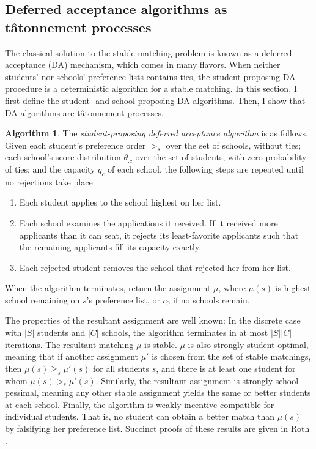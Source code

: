 \documentclass[12pt]{article}
\theoremstyle{definition}
\newtheorem{algorithm}{Algorithm}
\begin{document}
\subsection{Deferred acceptance algorithms as t\^{atonnement} processes} \label{defaccaretat}
The classical solution to the stable matching problem is known as a deferred acceptance (DA) mechanism, which comes in many flavors. When neither students' nor schools' preference lists contains ties, the student-proposing DA procedure is a deterministic algorithm for a stable matching.  In this section, I first define the student- and school-proposing DA algorithms. Then, I show that DA algorithms are t\^{a}tonnement processes.

\begin{algorithm} \label{studentproposingDA}
The \emph{student-proposing deferred acceptance algorithm} is as follows. Given each student's preference order $>_s$ over the set of schools, without ties;  each school's score distribution $\theta_{.c}$ over the set of students, with zero probability of ties; and the capacity $q_c$ of each school, the following steps are repeated until no rejections take place:
\begin{enumerate}
\item Each student applies to the school highest on her list.
\item Each school examines the applications it received. If it received more applicants than it can seat, it rejects its least-favorite applicants such that the remaining applicants fill its capacity exactly.
\item Each rejected student removes the school that rejected her from her list.
\end{enumerate}
When the algorithm terminates, return the assignment $\mu$, where $\mu(s)$ is highest school remaining on $s$'s preference list, or $c_0$ if no schools remain. 
\end{algorithm}
The properties of the resultant assignment are well known: In the discrete case with $|S|$ students and $|C|$ schools, the algorithm terminates in at most $|S||C|$ iterations. The resultant matching $\mu$ is stable. $\mu$ is also strongly student optimal, meaning that if another assignment $\mu'$ is chosen from the set of stable matchings, then $\mu(s) \geq_s \mu'(s)$ for all students $s$, and there is at least one student for whom $\mu(s) >_s \mu'(s)$. Similarly, the resultant assignment is strongly school pessimal, meaning any other stable assignment yields the same or better students at each school. Finally, the algorithm is weakly incentive compatible for individual students. That is, no student can obtain a better match than $\mu(s)$ by falsifying her preference list. Succinct proofs of these results are given in Roth \parencite*{economicsofmatching}.
\end{document}
